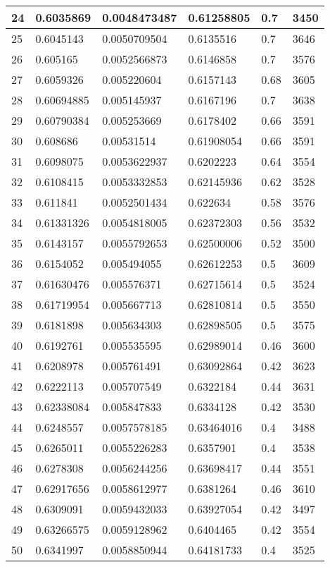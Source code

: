\begin{longtable}{|l|l|l|l|l|l|}
24 & 0.6035869 & 0.0048473487 & 0.61258805 & 0.7 & 3450 \\ \hline 
25 & 0.6045143 & 0.0050709504 & 0.6135516 & 0.7 & 3646 \\ \hline 
26 & 0.605165 & 0.0052566873 & 0.6146858 & 0.7 & 3576 \\ \hline 
27 & 0.6059326 & 0.005220604 & 0.6157143 & 0.68 & 3605 \\ \hline 
28 & 0.60694885 & 0.005145937 & 0.6167196 & 0.7 & 3638 \\ \hline 
29 & 0.60790384 & 0.005253669 & 0.6178402 & 0.66 & 3591 \\ \hline 
30 & 0.608686 & 0.00531514 & 0.61908054 & 0.66 & 3591 \\ \hline 
31 & 0.6098075 & 0.0053622937 & 0.6202223 & 0.64 & 3554 \\ \hline 
32 & 0.6108415 & 0.0053332853 & 0.62145936 & 0.62 & 3528 \\ \hline 
33 & 0.611841 & 0.0052501434 & 0.622634 & 0.58 & 3576 \\ \hline 
34 & 0.61331326 & 0.0054818005 & 0.62372303 & 0.56 & 3532 \\ \hline 
35 & 0.6143157 & 0.0055792653 & 0.62500006 & 0.52 & 3500 \\ \hline 
36 & 0.6154052 & 0.005494055 & 0.62612253 & 0.5 & 3609 \\ \hline 
37 & 0.61630476 & 0.005576371 & 0.62715614 & 0.5 & 3524 \\ \hline 
38 & 0.61719954 & 0.005667713 & 0.62810814 & 0.5 & 3550 \\ \hline 
39 & 0.6181898 & 0.005634303 & 0.62898505 & 0.5 & 3575 \\ \hline 
40 & 0.6192761 & 0.005535595 & 0.62989014 & 0.46 & 3600 \\ \hline 
41 & 0.6208978 & 0.005761491 & 0.63092864 & 0.42 & 3623 \\ \hline 
42 & 0.6222113 & 0.005707549 & 0.6322184 & 0.44 & 3631 \\ \hline 
43 & 0.62338084 & 0.005847833 & 0.6334128 & 0.42 & 3530 \\ \hline 
44 & 0.6248557 & 0.0057578185 & 0.63464016 & 0.4 & 3488 \\ \hline 
45 & 0.6265011 & 0.0055226283 & 0.6357901 & 0.4 & 3538 \\ \hline 
46 & 0.6278308 & 0.0056244256 & 0.63698417 & 0.44 & 3551 \\ \hline 
47 & 0.62917656 & 0.0058612977 & 0.6381264 & 0.46 & 3610 \\ \hline 
48 & 0.6309091 & 0.0059432033 & 0.63927054 & 0.42 & 3497 \\ \hline 
49 & 0.63266575 & 0.0059128962 & 0.6404465 & 0.42 & 3554 \\ \hline 
50 & 0.6341997 & 0.0058850944 & 0.64181733 & 0.4 & 3525 \\ \hline 
\end{longtable}